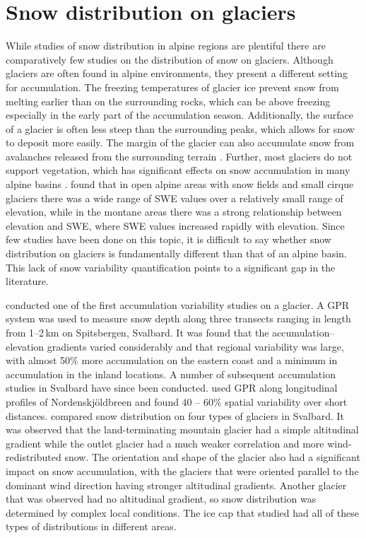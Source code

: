 \documentclass{sfuthesis}
\begin{document}
\section{Snow distribution on glaciers}
While studies of snow distribution in alpine regions are plentiful \citep[and sources within]{Clark2011} there are comparatively few studies on the distribution of snow on glaciers. Although glaciers are often found in alpine environments, they present a different setting for accumulation. The freezing temperatures of glacier ice prevent snow from melting earlier than on the surrounding rocks, which can be above freezing especially in the early part of the accumulation season. Additionally, the surface of a glacier is often less steep than the surrounding peaks, which allows for snow to deposit more easily. The margin of the glacier can also accumulate snow from avalanches released from the surrounding terrain \citep{Bloschl1991, Mott2008}. Further, most glaciers do not support vegetation, which has significant effects on snow accumulation in many alpine basins \citep{Pomeroy1999}. \cite{Alford1985} found that in open alpine areas with snow fields and small cirque glaciers there was a wide range of SWE values over a relatively small range of elevation, while in the montane areas there was a strong relationship between elevation and SWE, where SWE values increased rapidly with elevation. Since few studies have been done on this topic, it is difficult to say whether snow distribution on glaciers is fundamentally different than that of an alpine basin. This lack of snow variability quantification points to a significant gap in the literature.

\cite{Winther1998} conducted one of the first accumulation variability studies on a glacier. A GPR system was used to measure snow depth along three transects {\color{red} ranging in length from 1--2\,km} on Spitsbergen, Svalbard. It was found that the accumulation--elevation gradients varied considerably and that regional variability was large, with almost 50$\%$ more accumulation on the eastern coast and a minimum in accumulation in the inland locations. A number of subsequent accumulation studies in Svalbard have since been conducted. \cite{Palli2002} used GPR along longitudinal profiles of Nordenskj\"{o}ldbreen and found 40 -- 60$\%$ spatial variability over short distances. \cite{Grabiec2011} compared snow distribution on four types of glaciers in Svalbard. It was observed that the land-terminating mountain glacier had a simple altitudinal gradient while the outlet glacier had a much weaker correlation and more wind-redistributed snow. The orientation and shape of the glacier also had a significant impact on snow accumulation, with the glaciers that were oriented parallel to the dominant wind direction having stronger altitudinal gradients. Another glacier that was observed had no altitudinal gradient, so snow distribution was determined by complex local conditions. The ice cap that \cite{Grabiec2011} studied had all of these types of distributions in different areas.
\end{document}
